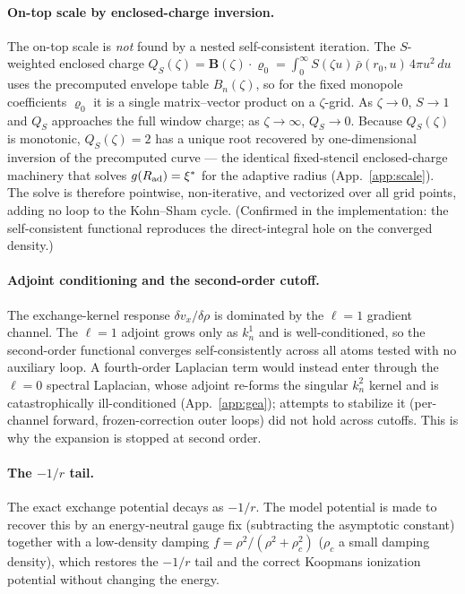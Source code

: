 \paragraph*{On-top scale by enclosed-charge inversion.}
The on-top scale is \emph{not} found by a nested self-consistent iteration. The
$S$-weighted enclosed charge
$Q_S(\zeta)=\mathbf B(\zeta)\cdot\bm\varrho_0=\int_0^\infty S(\zeta u)\,\bar\rho(r_0,u)\,4\pi u^2\,du$
uses the precomputed envelope table $B_n(\zeta)$, so for the fixed monopole
coefficients $\bm\varrho_0$ it is a single matrix--vector product on a $\zeta$-grid. As
$\zeta\to0$, $S\to1$ and $Q_S$ approaches the full window charge; as
$\zeta\to\infty$, $Q_S\to0$. Because $Q_S(\zeta)$ is monotonic, $Q_S(\zeta)=2$ has a
unique root recovered by one-dimensional inversion of the precomputed curve --- the
identical fixed-stencil enclosed-charge machinery that solves $g(R_{\mathrm{ad}})=\xi^*$ for
the adaptive radius (App.~\ref{app:scale}). The solve is therefore pointwise,
non-iterative, and vectorized over all grid points, adding no loop to the
Kohn--Sham cycle. (Confirmed in the implementation: the self-consistent functional
reproduces the direct-integral hole on the converged density.)

\paragraph*{Adjoint conditioning and the second-order cutoff.}
The exchange-kernel response $\delta v_x/\delta\rho$ is dominated by the $\ell=1$
gradient channel. The $\ell=1$ adjoint grows only as $k_n^1$ and is well-conditioned, so
the second-order functional converges self-consistently across all atoms tested with
no auxiliary loop. A fourth-order Laplacian term would instead enter through the
$\ell=0$ spectral Laplacian, whose adjoint re-forms the singular $k_n^2$ kernel and is
catastrophically ill-conditioned (App.~\ref{app:gea}); attempts to stabilize it
(per-channel forward, frozen-correction outer loops) did not hold across cutoffs.
This is why the expansion is stopped at second order.

\paragraph*{The $-1/r$ tail.}
The exact exchange potential decays as $-1/r$. The model potential is made to
recover this by an energy-neutral gauge fix (subtracting the asymptotic constant)
together with a low-density damping $f=\rho^2/(\rho^2+\rho_c^2)$ ($\rho_c$ a small
damping density), which restores the $-1/r$ tail and the correct Koopmans
ionization potential without changing the energy.

